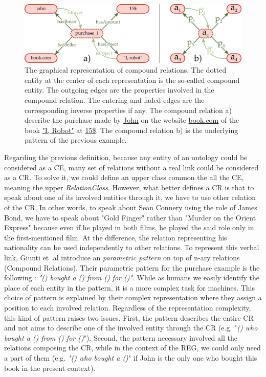 \begin{figure}[ht!]
\centering
\includegraphics[width=\textwidth]{figures/chapter7/CR.png}
\caption{\label{fig:chap7_cr} The graphical representation of compound relations. The dotted entity at the center of each representation is the so-called compound entity. The outgoing edges are the properties involved in the compound relation. The entering and faded edges are the corresponding inverse properties if any. The compound relation a) describe the purchase made by \underline{John} on the website \underline{book.com} of the book \underline{"I, Robot"} at \underline{15\$}. The compound relation b) is the underlying pattern of the previous example.}
\end{figure}

Regarding the previous definition, because any entity of an ontology could be considered as a CE, many set of relations without a real link could be considered as a CR. To solve it, we could define an upper class common the all the CE, meaning the upper \textit{RelationClass}. However, what better defines a CR is that to speak about one of its involved entities through it, we have to use other relation of the CR. In other words, to speak about Sean Connery using the role of James Bond, we have to speak about "Gold Finger" rather than "Murder on the Orient Express" because even if he played in both films, he played the said role only in the first-mentioned film. At the difference, the relation representing his nationality can be used independently to other relations. To represent this verbal link, Giunti et .al \cite{giunti_2019_representing} introduce an \textit{parametric pattern} on top of n-ary relations (Compound Relations). Their parametric pattern for the purchase example is the following : \textit{"() bought a () from () for ()"}. While as humans we easily identify the place of each entity in the pattern, it is a more complex task for machines. This choice of pattern is explained by their complex representation where they assign a position to each involved relation. Regardless of the representation complexity, this kind of pattern raises two issues. First, the pattern describes the entire CR and not aims to describe one of the involved entity through the CR (e.g. "\textit{() who bought a () from () for ()}"). Second, the pattern necessary involved all the relations composing the CR, while in the context of the REG, we could only need a part of them (e.g. \textit{"() who bought a ()}" if John is the only one who bought this book in the present context).

